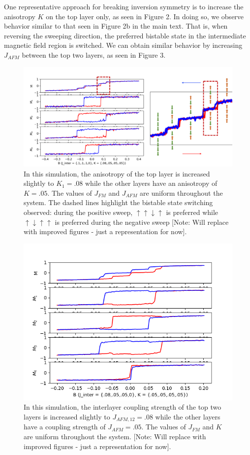 \documentclass[10pt]{article}
\begin{document}
One representative approach for breaking inversion symmetry is to increase the anisotropy $K$ on the top layer only, as seen in Figure 2. In doing so, we observe behavior similar to that seen in Figure 2b in the main text. That is,
when reversing the sweeping direction, the preferred bistable state in the intermediate magnetic field region is switched. We can obtain similar behavior by increasing $J_{AFM}$ between the top two layers, as seen in Figure 3.

\begin{figure}[!htb]
\includegraphics[width=\textwidth]{bistable.png}
\caption{In this simulation, the anisotropy of the top layer is increased slightly to $K_{1} = .08$ while the other layers have an anisotropy of $K = .05$. The values of
$J_{FM}$ and $J_{AFM}$ are uniform throughout the system. The dashed lines highlight the bistable state switching observed: during the positive sweep,  $\uparrow \uparrow \downarrow \uparrow$
is preferred while  $\uparrow \downarrow \uparrow  \uparrow$ is preferred during the negative sweep [Note: Will replace with improved figures - just a representation for now]. }
\end{figure}

\begin{figure}[!htb]
\includegraphics[width=\textwidth]{sim_6.png}
\caption{In this simulation, the interlayer coupling strength of the top two layers is increased slightly to $J_{AFM,12} = .08$ while the other layers have a coupling strength of $J_{AFM} = .05$. The values of
$J_{FM}$ and $K$ are uniform throughout the system. [Note: Will replace with improved figures - just a representation for now]. }
\end{figure}
\end{document}
